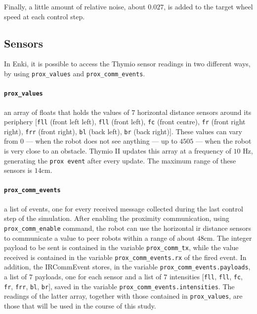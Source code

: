 Finally, a little amount of relative noise, about $0.027$, is added to the target 
wheel speed at each control step.

\subsection{Sensors}
\label{subsec:enkisensors}
In Enki, it is possible to access the Thymio sensor readings in two different ways, 
by using \texttt{prox\_values} and \texttt{prox\_comm\_events}.

\paragraph*{\texttt{prox\_values}}
 an array of floats that holds the values of $7$ horizontal distance sensors around 
 its periphery [\texttt{fll} (front left left), \texttt{fll} (front left), \texttt{fc} (front 
 centre), \texttt{fr} (front right right), \texttt{frr} (front right), \texttt{bl} (back left), 
 \texttt{br} (back right)]. 
These values can vary from $0$ — when the robot does not see anything — up to 
$4505$ — when the robot is very close to an obstacle. 
Thymio II updates this array at a frequency of $10$ \gls{Hz}, generating the 
\texttt{prox event} after every update. 
The maximum range of these sensors is $14$\gls{cm}.

\paragraph*{\texttt{prox\_comm\_events}}

a list of events, one for every received message collected during the last control 
step of the simulation. 
After enabling the proximity communication, using \texttt{prox\_comm\_enable} 
command, the robot can use the horizontal \gls{ir} distance sensors to 
communicate a value to peer robots within a range of about $48$\gls{cm}. 
The integer payload to be sent is contained in the variable 
\texttt{prox\_comm\_tx}, while the value received is contained in the variable 
\texttt{prox\_comm\_events.rx} of the fired event.
In addition, the IRCommEvent stores, in the variable 
\texttt{prox\_comm\_events.payloads}, a list of $7$ payloads, one for each sensor 
and a list of  $7$ intensities  [\texttt{fll}, \texttt{fll}, \texttt{fc}, \texttt{fr}, 
\texttt{frr}, \texttt{bl}, \texttt{br}], saved in the variable 
\texttt{prox\_comm\_events.intensities}.
The readings of the latter array, together with those contained in 
\texttt{prox\_values}, are those that will be used in the course of this study.

